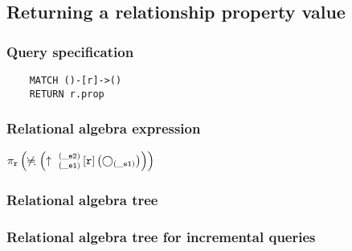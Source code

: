 	\subsection{Returning a relationship property value}

	\subsubsection*{Query specification}

	\begin{lstlisting}
	MATCH ()-[r]->()
	RETURN r.prop
	\end{lstlisting}


	\subsubsection*{Relational algebra expression}

	$\projection{\var{r}} \left(\alldifferent{} \left(\expandout{\_e1}{\_e2}{}{r}{} \left(\getvertices{\_e1}{}\right)\right)\right)$

	\subsubsection*{Relational algebra tree}


	\subsubsection*{Relational algebra tree for incremental queries}

